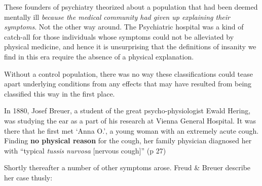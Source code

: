 These founders of psychiatry theorized about a population that had been deemed mentally ill \emph{because the medical community had given up explaining their symptoms}. Not the other way around. The Psychiatric hospital was a kind of catch-all for those individuals whose symptoms could not be alleviated by physical medicine, and hence it is unsurprising that the definitions of insanity we find in this era require the absence of a physical explanation.

Without a control population, there was no way these classifications could tease apart underlying conditions from any effects that may have resulted from being classified this way in the first place. 

In 1880, Josef Breuer, a student of the great psycho-physiologist Ewald Hering, was studying the ear as a part of his research at Vienna General Hospital. It was there that he first met `Anna O.', a young woman with an extremely acute cough. Finding \textbf{no physical reason} for the cough, her family physician diagnosed her with “typical \emph{tussis nurvosa} [nervous cough]” (p 27) 

Shortly thereafter a number of other symptoms arose. Freud \& Breuer describe her case thusly:

